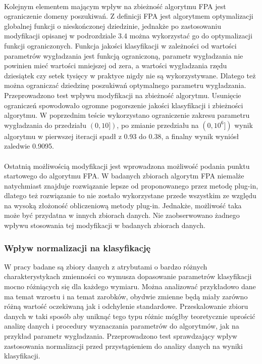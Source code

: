 \documentclass[a4paper,12pt,twoside]{article}
\begin{document}
\paragraph{}
Kolejnym elementem mającym wpływ na zbieżność algorytmu FPA jest ograniczenie domeny poszukiwań. Z definicji FPA jest algorytmem optymalizacji globalnej funkcji o nieskończonej dziedzinie, jednakże po zastosowaniu modyfikacji opisanej w podrozdziale 3.4  można wykorzystać go do optymalizacji funkcji ograniczonych. Funkcja jakości klasyfikacji w zależności od wartości parametrów wygładzania jest funkcją ograniczoną, parametr wygładzania nie powinien mieć wartości mniejszej od zera, a wartości wygładzania rzędu dziesiątek czy setek tysięcy w praktyce nigdy nie są wykorzystywane. Dlatego też można ograniczać dziedzinę poszukiwań optymalnego parametru wygładzania. Przeprowadzono test wpływu modyfikacji na zbieżność algorytmu. Usunięcie ograniczeń spowodowało ogromne pogorszenie jakości klasyfikacji i zbieżności algorytmu. W poprzednim teście wykorzystano ograniczenie zakresu parametru wygładzania do przedziału $(0,10])$, po zmianie przedziału na $(0,10^6])$ wynik algorytmu w pierwszej iteracji spadł z 0.93 do 0.38, a finalny wynik wyniósł zaledwie 0.9095. 

\paragraph{}
Ostatnią możliwością modyfikacji jest wprowadzona możliwość podania punktu startowego do algorytmu FPA. W badanych zbiorach algorytm FPA niemalże natychmiast znajduje rozwiązanie lepsze od proponowanego przez metodę plug-in, dlatego też rozwiązanie to nie zostało wykorzystane przede wszystkim ze względu na wysoką złożoność obliczeniową metody plug-in. Jednakże, możliwość taka może być przydatna w innych zbiorach danych. Nie zaobserwowano żadnego wpływu stosowania tej modyfikacji w badanych zbiorach danych.
\subsubsection{Wpływ normalizacji na klasyfikację}
W pracy badane są zbiory danych z atrybutami o bardzo różnych charakterystykach zmienności co wymusza dopasowanie parametrów klasyfikacji mocno różniących się dla każdego wymiaru. Można analizować przykładowo dane ma temat wzrostu i na temat zarobków, obydwie zmienne będą miały zarówno różną wartość oczekiwaną jak i odchylenie standardowe.  Przeskalowanie zbioru danych w taki sposób aby uniknąć tego typu różnic mógłby teoretycznie uprościć analizę danych i procedury wyznaczania parametrów do algorytmów, jak na przykład parametr wygładzania. Przeprowadzono test sprawdzający wpływ zastosowania normalizacji przed przystąpieniem do analizy danych na wyniki klasyfikacji. 
\end{document}
